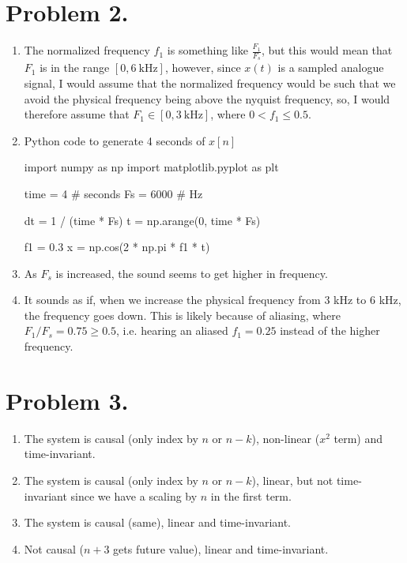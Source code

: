 \documentclass[a4paper,11pt,norsk]{article}
\begin{document}
\section*{Problem 2.}
\begin{enumerate}
    \item The normalized frequency $f_1$ is something like $\frac{F_1}{F_s}$, but this would mean that $F_1$ is in the range $[0, \SI{6}{\kilo\hertz}]$, however,
        since $x(t)$ is a sampled analogue signal, I would assume that the normalized frequency would be such that we avoid the physical frequency being above the nyquist 
        frequency, so, I would therefore assume that $F_1 \in [0, \SI{3}{\kilo\hertz}]$, where $0 < f_1 \leq 0.5$.
    \item Python code to generate 4 seconds of $x[n]$
\begin{pythoncode}
import numpy as np
import matplotlib.pyplot as plt

time = 4  # seconds
Fs = 6000 # Hz

dt = 1 / (time * Fs)
t = np.arange(0, time * Fs)

f1 = 0.3
x  = np.cos(2 * np.pi * f1 * t)       
\end{pythoncode}
    \item As $F_s$ is increased, the sound seems to get higher in frequency.
    \item It sounds as if, when we increase the physical frequency from 3 kHz to 6 kHz, the frequency goes down. This is 
        likely because of aliasing, where $F_1/F_s = 0.75 \geq 0.5$, i.e. hearing an aliased $f_1 = 0.25$ instead of the higher frequency.
\end{enumerate}

\section*{Problem 3.}
\begin{enumerate}
    \item The system is causal (only index by $n$ or $n - k$), non-linear ($x^2$ term) and time-invariant.
    \item The system is causal (only index by $n$ or $n - k$), linear, but not time-invariant since we have a scaling by $n$ in the first term.
    \item The system is causal (same), linear and time-invariant.
    \item Not causal ($n + 3$ gets future value), linear and time-invariant.
\end{enumerate}
\end{document}
